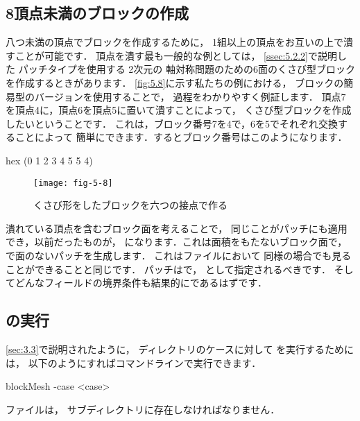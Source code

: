 \subsection{8頂点未満のブロックの作成}
\label{ssec:5.3.3}
八つ未満の頂点でブロックを作成するために，
1組以上の頂点をお互いの上で潰すことが可能です．
頂点を潰す最も一般的な例としては，
\autoref{ssec:5.2.2}で説明した
%
%
パッチタイプを使用する
2次元の%
%
軸対称問題のための6面のくさび型ブロックを作成するときがあります．
\autoref{fig:5.8}に示す私たちの例における，
ブロックの簡易型のバージョンを使用することで，
過程をわかりやすく例証します．
頂点7を頂点4に，頂点6を頂点5に置いて潰すことによって，
くさび型ブロックを作成したいということです．
これは，ブロック番号7を4で，6を5でそれぞれ交換することによって
簡単にできます．するとブロック番号はこのようになります．
\begin{OFverbatim}[file]
hex (0 1 2 3 4 5 5 4)
\end{OFverbatim}


\begin{figure}[ht]
 \texttt{[image: fig-5-8]}
 \caption{くさび形をしたブロックを六つの接点で作る}
 \label{fig:5.8}
\end{figure}


潰れている頂点を含むブロック面を考えることで，
同じことがパッチにも適用でき，以前だったものが，
になります．これは面積をもたないブロック面で，
で面のないパッチを生成します．
これはファイルにおいて
同様の場合でも見ることができることと同じです．
パッチはで，
として指定されるべきです．
そしてどんなフィールドの境界条件も結果的にであるはずです．


\subsection{の実行}
\label{ssec:5.3.4}
\autoref{sec:3.3}で説明されたように，
ディレクトリのケースに対して
を実行するためには，
以下のようにすればコマンドラインで実行できます．
\begin{OFverbatim}[terminal]
blockMesh -case <case>
\end{OFverbatim}
%
%
ファイルは，
サブディレクトリに存在しなければなりません．



